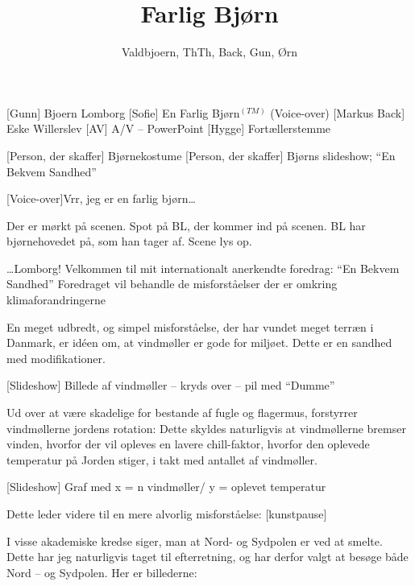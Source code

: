 \documentclass[a4paper,11pt]{article}
\title{Farlig Bjørn}
\author{Valdbjoern, ThTh, Back, Gun, Ørn}
\begin{document}
\maketitle

\begin{roles}
    [Gunn] Bjoern Lomborg
    [Sofie] En Farlig Bjørn$ ^{(TM)} $ (Voice-over)
    [Markus Back] Eske Willerslev
    [AV] A/V -- PowerPoint
    [Hygge] Fortællerstemme
\end{roles}

\begin{props}
    [Person, der skaffer] Bjørnekostume
    [Person, der skaffer] Bjørns slideshow; ``En Bekvem Sandhed''
\end{props}


\begin{sketch}

[Voice-over]Vrr, jeg er en farlig bjørn\ldots 

\scene Der er mørkt på scenen. Spot på BL, der kommer ind på scenen. BL har bjørnehovedet på, som han tager af. Scene lys op.

 \ldots  Lomborg!
 Velkommen til mit internationalt anerkendte foredrag: ``En Bekvem Sandhed''
 Foredraget vil behandle de misforståelser der er omkring klimaforandringerne

 En meget udbredt, og simpel misforståelse, der har vundet meget terræn i Danmark, er idéen om, at vindmøller er gode for miljøet. Dette er en sandhed med modifikationer.

[Slideshow] Billede af vindmøller -- kryds over -- pil med ``Dumme''

 Ud over at være skadelige for bestande af fugle og flagermus, forstyrrer vindmøllerne jordens rotation: Dette skyldes naturligvis at vindmøllerne bremser vinden, hvorfor der vil opleves en lavere chill-faktor, hvorfor den oplevede temperatur på Jorden stiger, i takt med antallet af vindmøller.

[Slideshow] Graf med x = n vindmøller/ y = oplevet temperatur

 Dette leder videre til en mere alvorlig misforståelse: [kunstpause]

 I visse akademiske kredse siger, man at Nord- og Sydpolen er ved at smelte. Dette har jeg naturligvis taget til efterretning, og har derfor valgt at besøge både Nord -- og Sydpolen. Her er billederne:


\end{sketch}
\end{document}
